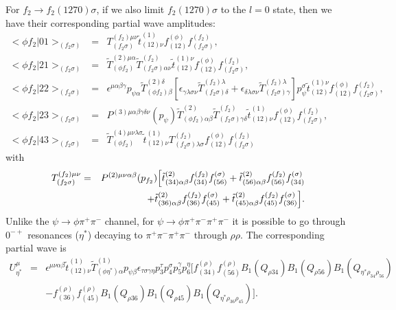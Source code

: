 For $f_2\to f_2(1270)\sigma$, if we also limit $f_2(1270)\sigma$
to the $l=0$ state, then we have their corresponding partial wave
amplitudes:
\begin{eqnarray}
<\phi f_2|01>_{(f_2\sigma)} \!&=&\! T^{(f_2)\mu\nu}_{(f_2\sigma)}
\tilde t^{(1)}_{(12)\nu} f_{(12)}^{(\phi)}f_{(f_2\sigma)}^{(f_2)} , \\
<\phi f_2|21>_{(f_2\sigma)} \!&=&\! \tilde T^{(2)\mu\alpha}_{(\phi
f_2)} \tilde T^{(f_2)}_{(f_2\sigma)\alpha\nu}\tilde
t^{(1)\nu}_{(12)}f_{(12)}^{(\phi)} f_{(f_2\sigma)}^{(f_2)}, \\
<\phi f_2|22>_{(f_2\sigma)} \!&=&\!
\epsilon^{\mu\alpha\beta\gamma} p_{\psi\alpha} \tilde
T^{(2)\delta}_{(\phi f_2)\beta} [\epsilon_{\gamma\lambda\sigma\nu}
\tilde T^{(f_2)\lambda}_{(f_2\sigma)\delta}
+\epsilon_{\delta\lambda\sigma\nu} \tilde
T^{(f_2)\lambda}_{(f_2\sigma)\gamma}]p_\psi^\sigma \tilde
t^{(1)\nu}_{(12)}
f_{(12)}^{(\phi)}f_{(f_2\sigma)}^{(f_2)}, \\
<\phi f_2|23>_{(f_2\sigma)} \!&=&\!
P^{(3)\mu\alpha\beta\gamma\delta\nu}(p_\psi) \tilde T^{(2)}_{(\phi
f_2)\alpha\beta} \tilde T^{(f_2)}_{(f_2\sigma)\gamma\delta} \tilde
t^{(1)}_{(12)\nu}f_{(12)}^{(\phi)}f_{(f_2\sigma)}^{(f_2)}, \\
<\phi f_2|43>_{(f_2\sigma)} \!&=&\! \tilde
T^{(4)\mu\nu\lambda\sigma}_{(\phi f_2)}
        \tilde t^{(1)}_{(12)\nu} T^{(f_2)}_{(f_2\sigma)\lambda\sigma}
f_{(12)}^{(\phi)}f_{(f_2\sigma)}^{(f_2)}
\end{eqnarray}
with
\begin{eqnarray}
T^{(f_2)\mu\nu}_{(f_2\sigma)} &=&
P^{(2)\mu\nu\alpha\beta}(p_{f_2}) \Bigl[\tilde
t^{(2)}_{(34)\alpha\beta}
f^{(f_2)}_{(34)}f^{(\sigma)}_{(56)}+\tilde
t^{(2)}_{(56)\alpha\beta}
f^{(f_2)}_{(56)}f^{(\sigma)}_{(34)} \nonumber\\
& & \quad\quad\quad\quad+ \tilde t^{(2)}_{(36)\alpha\beta}
f^{(f_2)}_{(36)}f^{(\sigma)}_{(45)}+ \tilde
t^{(2)}_{(45)\alpha\beta}
f^{(f_2)}_{(45)}f^{(\sigma)}_{(36)}\Bigr].
\end{eqnarray}
Unlike the $\psi\to\phi\pi^+\pi^-$ channel, for
$\psi\to\phi\pi^+\pi^-\pi^+\pi^-$ it is possible to go through
$0^{-+}$ resonances ($\eta^*$) decaying to $\pi^+\pi^-\pi^+\pi^-$
through $\rho\rho$. The corresponding partial wave is
\begin{eqnarray}
U^\mu_{\eta^*} \!&=&\! \epsilon^{\mu\nu\alpha\beta}\tilde
t^{(1)}_{(12)\nu} \tilde T^{(1)}_{(\phi\eta^*)\alpha}p_{\psi\beta}
                         \epsilon_{\tau\sigma\gamma\eta}p_3^\tau
                         p_4^\sigma p_5^\gamma p_6^\eta
                         [f_{(34)}^{(\rho)}f_{(56)}^{(\rho)}
                         B_1(Q_{\rho 34})B_1(Q_{\rho 56})
                         B_1(Q_{\eta^*\rho_{34}\rho_{56}})
                         \nonumber \\
                   &   & -f_{(36)}^{(\rho)}f_{(45)}^{(\rho)}
                         B_1(Q_{\rho 36})B_1(Q_{\rho 45})
                         B_1(Q_{\eta^*\rho_{36}\rho_{45}})] .
\end{eqnarray}

